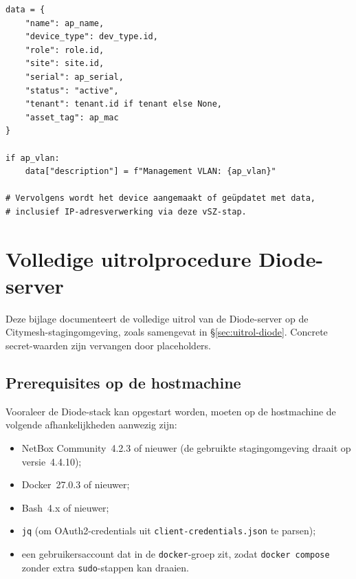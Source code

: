 \begin{listing}[H]
  \caption[RUCKUS vSZ: inventarisdict richting NetBox]{RUCKUS vSZ: inventarisdict richting NetBox (\S\ref{sec:issues-valkuilen})}
  \label{lst:ruckus-vsz-netbox-inventory}
  \begin{verbatim}
data = {
    "name": ap_name,
    "device_type": dev_type.id,
    "role": role.id,
    "site": site.id,
    "serial": ap_serial,
    "status": "active",
    "tenant": tenant.id if tenant else None,
    "asset_tag": ap_mac
}

if ap_vlan:
    data["description"] = f"Management VLAN: {ap_vlan}"

# Vervolgens wordt het device aangemaakt of geüpdatet met data,
# inclusief IP-adresverwerking via deze vSZ-stap.
  \end{verbatim}
\end{listing}

\section{Volledige uitrolprocedure Diode-server}
\label{sec:bijlage-diode-uitrol}

Deze bijlage documenteert de volledige uitrol van de Diode-server op de Citymesh-stagingomgeving, zoals samengevat in \S\ref{sec:uitrol-diode}. Concrete secret-waarden zijn vervangen door placeholders.

\subsection{Prerequisites op de hostmachine}

Vooraleer de Diode-stack kan opgestart worden, moeten op de hostmachine de volgende afhankelijkheden aanwezig zijn:

\begin{itemize}
  \item NetBox Community~4.2.3 of nieuwer (de gebruikte stagingomgeving draait op versie~4.4.10);
  \item Docker~27.0.3 of nieuwer;
  \item Bash~4.x of nieuwer;
  \item \texttt{jq} (om OAuth2-credentials uit \texttt{client-credentials.json} te parsen);
  \item een gebruikersaccount dat in de \texttt{docker}-groep zit, zodat \texttt{docker compose} zonder extra \texttt{sudo}-stappen kan draaien.
\end{itemize}

